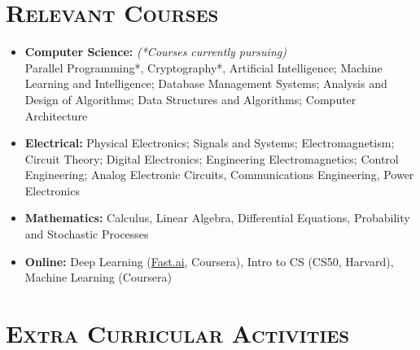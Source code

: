 \documentclass{article}
\newenvironment{longversion}{}{} %
\newcommand{\tmpsection}[1]{}
\let\tmpsection=\section
\renewcommand{\section}[1]{\tmpsection*{\textsc{#1}}}
\begin{document}
\begin{longversion}
\section{Relevant Courses}
\begin{itemize}
\setlength\itemsep{-1em}


\item \textbf{Computer Science:} \hfill \textit{(*Courses currently pursuing)}\\
Parallel Programming*, Cryptography*, Artificial Intelligence; Machine Learning and Intelligence; Database Management Systems; Analysis and Design of Algorithms; Data Structures and Algorithms; Computer Architecture\\

\item \textbf{Electrical:}
Physical Electronics; Signals and Systems; Electromagnetism; Circuit Theory; Digital Electronics; Engineering Electromagnetics; Control Engineering; Analog Electronic Circuits, Communications Engineering, Power Electronics\\ 

\item \textbf{Mathematics:} Calculus, Linear Algebra, Differential Equations, Probability and Stochastic Processes\\

\item \textbf{Online:}
Deep Learning (\href{http://www.fast.ai/}{Fast.ai}, Coursera), Intro to CS (CS50, Harvard), Machine Learning (Coursera)

\end{itemize}
\end{longversion}



\section{Extra Curricular Activities}
\end{document}

